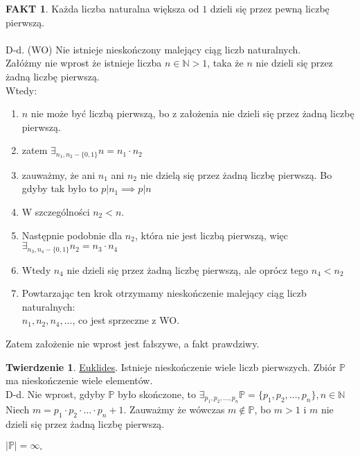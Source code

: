 \documentclass{article}
\theoremstyle{definition}
\theoremstyle{definition}
\newtheorem{tw}{Twierdzenie}[subsection]
\theoremstyle{definition}
\theoremstyle{definition}
\newtheorem*{fakt}{FAKT}
\begin{document}
\begin{fakt}
    Każda liczba naturalna większa od $1$
    dzieli się przez pewną liczbę pierwszą.\\\\
    D-d. (WO) Nie istnieje nieskończony malejący ciąg liczb naturalnych.\\
    Załóżmy nie wprost że istnieje liczba $n\in\mathbb{N} > 1$,
    taka że $n$ nie dzieli się przez żadną liczbę pierwszą.\\
    Wtedy:
    \begin{enumerate}
        \item $n$ nie może być liczbą pierwszą, bo z założenia nie dzieli się przez żadną liczbę pierwszą.
        \item zatem $\exists_{n_1,n_2-\{0,1\}} n=n_1\cdot n_2$
        \item zauważmy, że ani $n_1$ ani $n_2$ nie dzielą się przez żadną liczbę pierwszą. 
        Bo gdyby tak było to $p|n_1 \implies p|n$
        \item W szczególności $n_2<n$. 
        \item Następnie podobnie dla $n_2$, która nie jest liczbą pierwszą, więc $\exists_{n_3,n_4-\{0,1\}} n_2=n_3\cdot n_4$
        \item Wtedy $n_4$ nie dzieli się przez żadną liczbę pierwszą, ale oprócz tego $n_4<n_2$
        \item Powtarzając ten krok otrzymamy nieskończenie malejący ciąg liczb naturalnych:\\
        $n_1, n_2, n_4, \dots$, co jest sprzeczne z WO. 
    \end{enumerate}
    Zatem założenie nie wprost jest fałszywe, a fakt prawdziwy.
\end{fakt}

\begin{tw}
    \underline{Euklides}. Istnieje nieskończenie wiele liczb pierwszych. Zbiór $\mathbb{P}$ ma nieskończenie wiele elementów.\\
    D-d. Nie wprost, gdyby $\mathbb{P}$ było skończone, to $\exists_{p_1,p_2,\dots,p_n} \mathbb{P}=\{p_1,p_2,\dots,p_n\}, n\in\mathbb{N}$\\
    Niech $m=p_1\cdot p_2\cdot \dots \cdot p_n + 1$. Zauważmy że wówczas $m\notin\mathbb{P}$, bo $m>1$ i $m$ nie dzieli się przez żadną liczbę pierwszą.
    \begin{center}
        $|\mathbb{P}|=\infty_\square$
    \end{center}
\end{tw}
\end{document}
